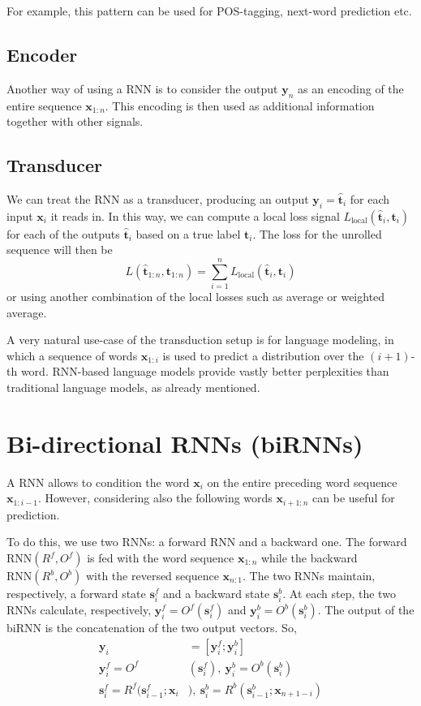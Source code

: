 \begin{example}{}
For example, this pattern can be used for POS-tagging, next-word prediction etc.
\end{example}

\subsection{Encoder}
Another way of using a RNN is to consider the output $\mathbf{y}_{n}$ as an encoding of the entire sequence $\mathbf{x}_{1:n}$. This encoding is then used as additional information together with other signals.

\subsection{Transducer}
We can treat the RNN as a transducer, producing an output $\mathbf{y}_{i}=\hat{\mathbf{t}}_{i}$ for each input $\mathbf{x}_{i}$ it reads in. In this way, we can compute a local loss signal $L_{\text{local}}(\hat{\mathbf{t}}_{i}, \mathbf{t}_{i})$ for each of the outputs $\hat{\mathbf{t}}_{i}$ based on a true label $\mathbf{t}_{i}$. The loss for the unrolled sequence will then be
\[
L(\hat{\mathbf{t}}_{1:n}, \mathbf{t}_{1:n})=\sum_{i=1}^{n}L_{\text{local}}(\hat{\mathbf{t}}_{i}, \mathbf{t}_{i})
\]
or using another combination of the local losses such as average or weighted average.

A very natural use-case of the transduction setup is for language modeling, in which a sequence of words $\mathbf{x}_{1:i}$ is used to predict a distribution over the $(i+1)$-th word. RNN-based language models provide vastly better perplexities than traditional language models, as already mentioned.

\section{Bi-directional RNNs (biRNNs)}
A RNN allows to condition the word $\mathbf{x}_{i}$ on the entire preceding word sequence $\mathbf{x}_{1:i-1}$. However, considering also the following words $\mathbf{x}_{i+1:n}$ can be useful for prediction.

To do this, we use two RNNs: a forward RNN and a backward one. The forward $\text{RNN}(R^f, O^f)$ is fed with the word sequence $\mathbf{x}_{1:n}$ while the backward $\text{RNN}(R^b, O^b)$ with the reversed sequence $\mathbf{x}_{n:1}$. The two RNNs maintain, respectively, a forward state $\mathbf{s}^f_{i}$ and a backward state $\mathbf{s}^{b}_{i}$.
At each step, the two RNNs calculate, respectively, $\mathbf{y}^f_{i}=O^f(\mathbf{s}^f_{i})$ and $\mathbf{y}^b_{i}=O^b(\mathbf{s}^b_{i})$. The output of the $\text{biRNN}$ is the concatenation of the two output vectors. So,
\[
\begin{aligned}
\mathbf{y}_{i}&=[\mathbf{y}^f_{i};\mathbf{y}^b_{i}] \\
\mathbf{y}^f_{i}=O^f&(\mathbf{s}^f_{i}),\:\mathbf{y}^b_{i}=O^b(\mathbf{s}^b_{i}) \\
\mathbf{s}_{i}^f=R^f(\mathbf{s}^f_{i-1};\mathbf{x}_{i}&),\:\mathbf{s}_{i}^b=R^b(\mathbf{s}^b_{i-1};\mathbf{x}_{n+1-i})
\end{aligned}
\]

